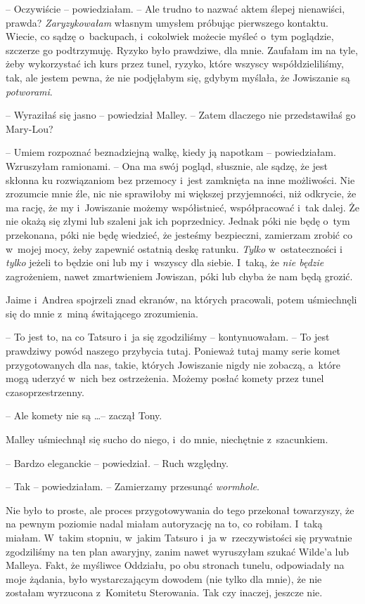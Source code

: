 \documentclass[oneside,polish,11pt,sfheadings]{mwbk}
\begin{document}
-- Oczywiście -- powiedziałam. -- Ale trudno to nazwać aktem ślepej
nienawiści, prawda? \textit{Zaryzykowałam} własnym umysłem próbując
pierwszego kontaktu. Wiecie, co sądzę o~backupach, i~cokolwiek możecie
myśleć o~tym poglądzie, szczerze go podtrzymuję. Ryzyko było prawdziwe,
dla mnie. Zaufałam im na tyle, żeby wykorzystać ich kurs przez tunel,
ryzyko, które wszyscy współdzieliliśmy, tak, ale jestem pewna, że nie
podjęłabym się, gdybym myślała, że Jowiszanie są \textit{potworami}.

-- Wyraziłaś się jasno -- powiedział Malley. -- Zatem dlaczego nie
przedstawiłaś go Mary-Lou?

-- Umiem rozpoznać beznadziejną walkę, kiedy ją napotkam -- powiedziałam.
Wzruszyłam ramionami. -- Ona ma swój pogląd, słusznie, ale sądzę, że jest
skłonna ku rozwiązaniom bez przemocy i~jest zamknięta na inne
możliwości. Nie zrozumcie mnie źle, nic nie sprawiłoby mi większej
przyjemności, niż odkrycie, że ma rację, że my i~Jowiszanie możemy
współistnieć, współpracować i~tak dalej. Że nie okażą się złymi lub
szaleni jak ich poprzednicy. Jednak póki nie będę o~tym przekonana, póki
nie będę wiedzieć, że jesteśmy bezpieczni, zamierzam zrobić co w~mojej
mocy, żeby zapewnić ostatnią deskę ratunku. \textit{Tylko} w~ostateczności
i \textit{tylko} jeżeli to będzie oni lub my i~wszyscy dla siebie. I~taką,
że \textit{nie będzie} zagrożeniem, nawet zmartwieniem Jowiszan, póki lub
chyba że nam będą grozić.

Jaime i~Andrea spojrzeli znad ekranów, na których pracowali, potem
uśmiechnęli się do mnie z~miną świtającego zrozumienia.

-- To jest to, na co Tatsuro i~ja się zgodziliśmy -- kontynuowałam. -- To
jest prawdziwy powód naszego przybycia tutaj. Ponieważ tutaj mamy serie
komet przygotowanych dla nas, takie, których Jowiszanie nigdy nie
zobaczą, a~które mogą uderzyć w~nich bez ostrzeżenia. Możemy posłać
komety przez tunel czasoprzestrzenny.

-- Ale komety nie są \ldots  -- zaczął Tony.

Malley uśmiechnął się sucho do niego, i~do mnie, niechętnie z~szacunkiem.

-- Bardzo eleganckie -- powiedział. -- Ruch względny.

-- Tak -- powiedziałam. -- Zamierzamy przesunąć \textit{wormhole}.

Nie było to proste, ale proces przygotowywania do tego przekonał
towarzyszy, że na pewnym poziomie nadal miałam autoryzację na to, co
robiłam. I~taką miałam. W~takim stopniu, w~jakim Tatsuro i~ja w~rzeczywistości się prywatnie zgodziliśmy na ten plan awaryjny, zanim
nawet wyruszyłam szukać Wilde'a lub Malleya. Fakt, że myśliwce Oddziału,
po obu stronach tunelu, odpowiadały na moje żądania, było wystarczającym
dowodem (nie tylko dla mnie), że nie zostałam wyrzucona z~Komitetu
Sterowania. Tak czy inaczej, jeszcze nie.
\end{document}
